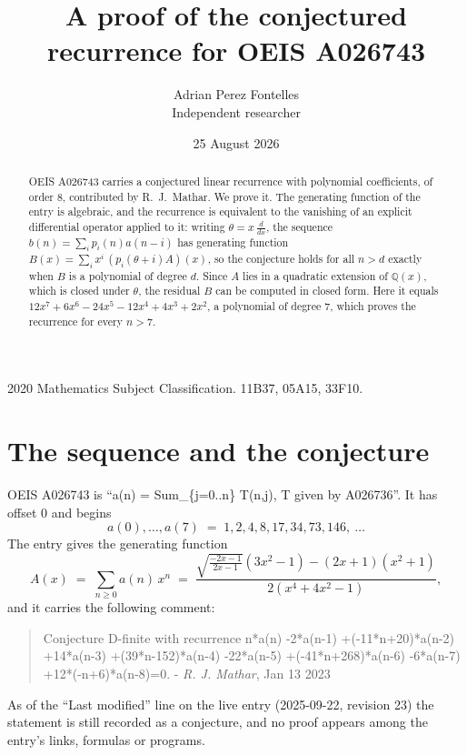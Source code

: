 \documentclass[11pt,a4paper]{article}
\title{A proof of the conjectured recurrence for OEIS A026743}
\author{Adrian Perez Fontelles\\ \small Independent researcher}
\date{25 August 2026}
\theoremstyle{plain}
\theoremstyle{definition}
\begin{document}
\maketitle

\begin{abstract}
OEIS A026743 carries a conjectured linear recurrence with polynomial coefficients, of
order 8, contributed by R.~J.~Mathar. We prove it. The generating function of the
entry is algebraic, and the recurrence is equivalent to the vanishing of an explicit
differential operator applied to it: writing $\theta=x\,\frac{d}{dx}$, the sequence
$b(n)=\sum_{i}p_{i}(n)a(n-i)$ has generating function
$B(x)=\sum_{i}x^{i}\,(p_{i}(\theta+i)A)(x)$, so the conjecture holds for all $n>d$ exactly
when $B$ is a polynomial of degree $d$. Since $A$ lies in a quadratic extension of
$\mathbb{Q}(x)$, which is closed under $\theta$, the residual $B$ can be computed in
closed form. Here it equals $12 x^{7} + 6 x^{6} - 24 x^{5} - 12 x^{4} + 4 x^{3} + 2 x^{2}$, a polynomial of degree $7$, which proves
the recurrence for every $n>7$.
\end{abstract}

\noindent\small 2020 Mathematics Subject Classification. 11B37, 05A15, 33F10.\normalsize

\section{The sequence and the conjecture}

OEIS A026743 is ``a(n) = Sum\_\{j=0..n\} T(n,j), T given by A026736''. It has offset $0$ and begins
\[
a(0),\dots,a(7)\;=\;1, 2, 4, 8, 17, 34, 73, 146,\ \dots
\]
The entry gives the generating function
\begin{equation}\label{eq:gf}
A(x)\;=\;\sum_{n\ge 0} a(n)\,x^{n}\;=\;\frac{\sqrt{\frac{- 2 x - 1}{2 x - 1}} \left(3 x^{2} - 1\right) - \left(2 x + 1\right) \left(x^{2} + 1\right)}{2 \left(x^{4} + 4 x^{2} - 1\right)} ,
\end{equation}
and it carries the following comment:
\begin{quote}\small
Conjecture D-finite with recurrence n*a(n) -2*a(n-1) +(-11*n+20)*a(n-2) +14*a(n-3) +(39*n-152)*a(n-4) -22*a(n-5) +(-41*n+268)*a(n-6) -6*a(n-7) +12*(-n+6)*a(n-8)=0. - \emph{R. J. Mathar}, Jan 13 2023
\end{quote}
As of the ``Last modified'' line on the live entry (2025-09-22, revision 23) the
statement is still recorded as a conjecture, and no proof appears among the entry's links,
formulas or programs.
\end{document}
